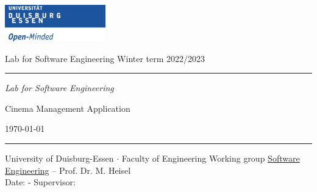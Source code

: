 \documentclass[a4paper,10pt,titlepage,bibtotoc,bibtotocnumbered]{scrreprt}
\begin{document}
\begin{titlepage}
\centering
\enlargethispage*{40mm}

\vspace*{-10mm}

\begin{minipage}[c]{0.25\textwidth}
\hspace*{-22mm}
\includegraphics[height=45pt]{figures/logo_uni}\linebreak
\end{minipage}
\begin{minipage}[r]{0.74\textwidth}
\vspace*{1mm}
\begin{flushright}
\Large{Lab for Software Engineering}\linebreak
\large{Winter term 2022/2023}\linebreak
\end{flushright}
\end{minipage}
\hspace*{-18mm}

\textcolor{blue}{\rule{154mm}{0.2mm}}


\vspace*{55mm}\vfill

\textit{Lab for Software Engineering}\vspace*{4mm}

\Huge{Cinema Management Application}\vspace*{7mm}

\Large{\vstudents}\vspace*{9mm}


\normalsize{\today}



\vspace*{80mm}

\textcolor{blue}{\rule{\textwidth}{0.2mm}}
\begin{flushleft}
\sf University of Duisburg-Essen $\cdot$ Faculty of Engineering
\large{Working group \href{http://swe.uni-due.de}{Software Engineering} -- Prof. Dr. M. Heisel}\\

\small{Date: \vlabtime- Supervisor: \vsupervisor}
\end{flushleft}

\end{titlepage}
\end{document}
